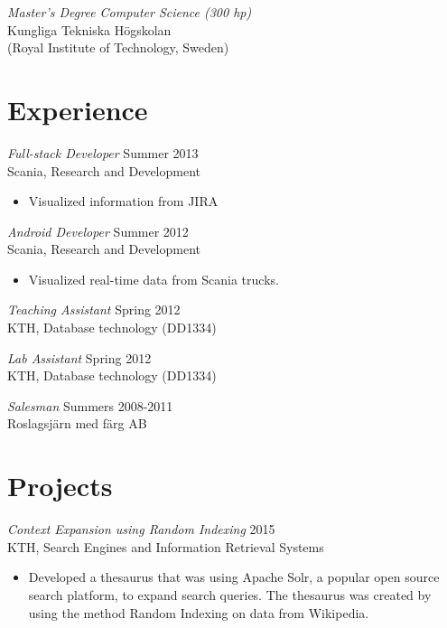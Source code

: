 \documentclass[margin, 10pt]{res} %
\begin{document}
\begin{resume}
{\sl Master's Degree Computer Science (300 hp)} \\
Kungliga Tekniska Högskolan \\
(Royal Institute of Technology, Sweden)

 
 
\section{Experience}

{\sl Full-stack Developer} \hfill Summer 2013 \\
Scania, Research and Development
\begin{itemize} \itemsep -2pt %
\item Visualized information from JIRA
\end{itemize}	
 
{\sl Android Developer} \hfill Summer 2012 \\
Scania, Research and Development
\begin{itemize} 
\item Visualized real-time data from Scania trucks.
\end{itemize} 

{\sl Teaching Assistant} \hfill Spring 2012 \\
KTH, Database technology (DD1334)

{\sl Lab Assistant} \hfill Spring 2012 \\
KTH, Database technology (DD1334)

{\sl Salesman} \hfill Summers 2008-2011 \\
Roslagsjärn med färg AB


\section{Projects}

{\sl Context Expansion using Random Indexing} \hfill 2015 \\
KTH, Search Engines and Information Retrieval Systems
\begin{itemize} 
\item Developed a thesaurus that was using Apache Solr, a popular open source search platform, to expand search queries. The thesaurus was created by using the method Random Indexing on data from Wikipedia.
\end{itemize} 


\end{resume}
\end{document}
